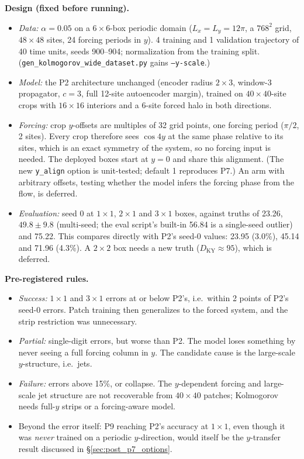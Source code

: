 \documentclass[11pt]{article}
\begin{document}
\textbf{Design (fixed before running).}
\begin{itemize}[leftmargin=*]
\item \emph{Data:} $\alpha{=}0.05$ on a $6\times6$-box periodic domain
  ($L_x{=}L_y{=}12\pi$, a $768^2$ grid, $48\times48$ sites, 24 forcing
  periods in $y$). 4 training and 1 validation trajectory of 40 time
  units, seeds 900--904; normalization from the training split.
  (\texttt{gen\_kolmogorov\_wide\_dataset.py} gains \texttt{--y-scale}.)
\item \emph{Model:} the P2 architecture unchanged (encoder radius
  $2\times3$, window-3 propagator, $c{=}3$, full 12-site autoencoder
  margin), trained on $40\times40$-site crops with $16\times16$
  interiors and a 6-site forced halo in both directions.
\item \emph{Forcing:} crop $y$-offsets are multiples of 32 grid points,
  one forcing period ($\pi/2$, 2 sites). Every crop therefore sees
  $\cos4y$ at the same phase relative to its sites, which is an exact
  symmetry of the system, so no forcing input is needed. The deployed
  boxes start at $y{=}0$ and share this alignment. (The new
  \texttt{y\_align} option is unit-tested; default 1 reproduces P7.) An
  arm with arbitrary offsets, testing whether the model infers the
  forcing phase from the flow, is deferred.
\item \emph{Evaluation:} seed 0 at $1\times1$, $2\times1$ and
  $3\times1$ boxes, against truths of 23.26, $49.8\pm9.8$ (multi-seed;
  the eval script's built-in 56.84 is a single-seed outlier) and 75.22.
  This compares directly with P2's seed-0 values: 23.95 (3.0\%), 45.14
  and 71.96 (4.3\%). A $2\times2$ box needs a new truth
  ($D_{\mathrm{KY}}\approx95$), which is deferred.
\end{itemize}

\textbf{Pre-registered rules.}
\begin{itemize}[leftmargin=*]
\item \emph{Success:} $1\times1$ and $3\times1$ errors at or below
  P2's, i.e.\ within 2 points of P2's seed-0 errors. Patch training then
  generalizes to the forced system, and the strip restriction was
  unnecessary.
\item \emph{Partial:} single-digit errors, but worse than P2. The
  model loses something by never seeing a full forcing column in $y$.
  The candidate cause is the large-scale $y$-structure, i.e.\ jets.
\item \emph{Failure:} errors above 15\%, or collapse. The $y$-dependent
  forcing and large-scale jet structure are not recoverable from
  $40\times40$ patches; Kolmogorov needs full-$y$ strips or a
  forcing-aware model.
\item Beyond the error itself: P9 reaching P2's accuracy at
  $1\times1$, even though it was \emph{never} trained on a periodic
  $y$-direction, would itself be the $y$-transfer result discussed in
  \S\ref{sec:post_p7_options}.
\end{itemize}
\end{document}
